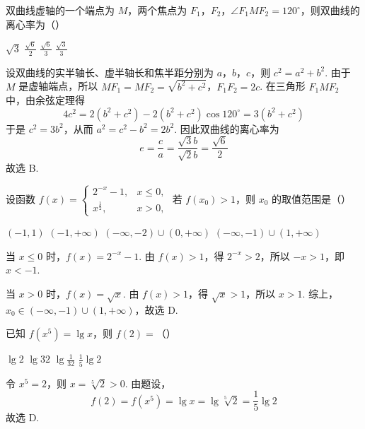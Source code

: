 \begin{problem}
双曲线虚轴的一个端点为 \(M\)，两个焦点为 \(F_1\)，\(F_2\)，\(\angle F_1MF_2=120^{\circ}\)，则双曲线的离心率为（\quad）

\choices
    {\(\sqrt3\)}
    {\(\frac{\sqrt6}{2}\)}
    {\(\frac{\sqrt6}{3}\)}
    {\(\frac{\sqrt3}{3}\)}

\begin{solution}
设双曲线的实半轴长、虚半轴长和焦半距分别为 \(a\)，\(b\)，\(c\)，则 \(c^2=a^2+b^2\). 由于 \(M\) 是虚轴端点，所以
\(MF_1=MF_2=\sqrt{b^2+c^2}\)，\(F_1F_2=2c\).
在三角形 \(F_1MF_2\) 中，由余弦定理得
\[
4c^2=2\left(b^2+c^2\right)-2\left(b^2+c^2\right)\cos120^{\circ}
=3\left(b^2+c^2\right)
\]
于是 \(c^2=3b^2\)，从而 \(a^2=c^2-b^2=2b^2\). 因此双曲线的离心率为
\[
e=\frac ca=\frac{\sqrt3b}{\sqrt2b}=\frac{\sqrt6}{2}
\]
故选 B.
\end{solution}
\end{problem}

\begin{problem}
设函数 \(f(x)=\begin{cases}
2^{-x}-1,&x\leqslant0,\\
x^{\frac12},&x>0,
\end{cases}\) 若 \(f(x_0)>1\)，则 \(x_0\) 的取值范围是（\quad）

\choices
    {\((-1,1)\)}
    {\((-1,+\infty)\)}
    {\((-\infty,-2)\cup(0,+\infty)\)}
    {\((-\infty,-1)\cup(1,+\infty)\)}

\begin{solution}
当 \(x\leqslant0\) 时，\(f(x)=2^{-x}-1\). 由 \(f(x)>1\)，得 \(2^{-x}>2\)，所以 \(-x>1\)，即 \(x<-1\).

当 \(x>0\) 时，\(f(x)=\sqrt{x}\). 由 \(f(x)>1\)，得 \(\sqrt{x}>1\)，所以 \(x>1\). 综上，\(x_0\in(-\infty,-1)\cup(1,+\infty)\)，故选 D.
\end{solution}
\end{problem}

\begin{problem}
已知 \(f(x^5)=\lg x\)，则 \(f(2)=\)（\quad）

\choices
    {\(\lg2\)}
    {\(\lg32\)}
    {\(\lg\frac1{32}\)}
    {\(\frac15\lg2\)}

\begin{solution}
令 \(x^5=2\)，则 \(x=\sqrt[5]{2}>0\). 由题设，
\[
f(2)=f(x^5)=\lg x=\lg\sqrt[5]{2}=\frac15\lg2
\]
故选 D.
\end{solution}
\end{problem}

